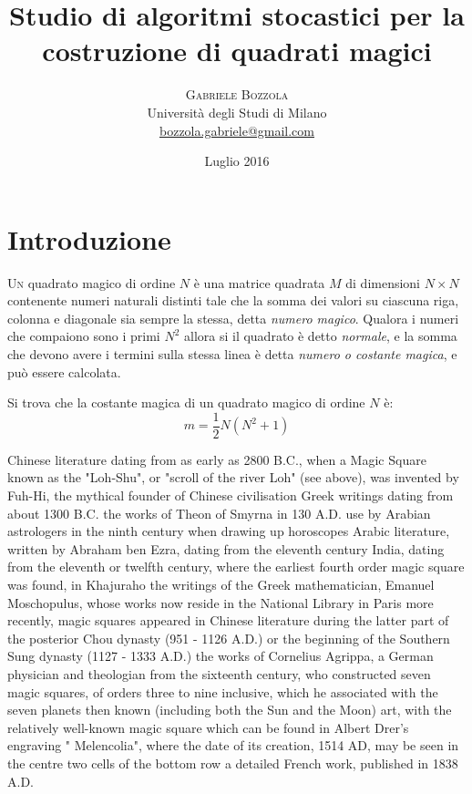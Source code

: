\documentclass[italian,twoside,twocolumn]{article}
\title{Studio di algoritmi stocastici per la costruzione di quadrati magici} %
\author{%
\textsc{Gabriele Bozzola} \\[1ex] %
\normalsize Università degli Studi di Milano \\ %
\normalsize \href{mailto:bozzola.gabriele@gmail.com}{bozzola.gabriele@gmail.com} %
}
\date{Luglio 2016} %
\begin{document}
\maketitle


\section{Introduzione}

\lettrine[nindent=0em,lines=3]{U}n quadrato magico di ordine $ N $ è una matrice quadrata  $ M $  di dimensioni $ N\times N $ contenente numeri naturali distinti tale che la somma dei valori su ciascuna riga, colonna e diagonale sia sempre la stessa, detta \emph{numero magico}. Qualora i numeri che compaiono sono i primi $ N^2 $ allora si il quadrato è detto \emph{normale}, e la somma che devono avere i termini sulla stessa linea è detta \emph{numero o costante magica}, e può essere calcolata. 

Si trova che la costante magica di un quadrato magico di ordine $ N $ è:
\[	 \mathit{m} = \frac{1}{2} N (N^2 + 1)	\]

Chinese literature dating from as early as 2800 B.C., when a Magic Square known as the "Loh-Shu", or "scroll of the river Loh" (see above), was invented by Fuh-Hi, the mythical founder of Chinese civilisation
Greek writings dating from about 1300 B.C.
the works of Theon of Smyrna in 130 A.D.
use by Arabian astrologers in the ninth century when drawing up horoscopes
Arabic literature, written by Abraham ben Ezra, dating from the eleventh century
India, dating from the eleventh or twelfth century, where the earliest fourth order magic square was found, in Khajuraho
the writings of the Greek mathematician, Emanuel Moschopulus, whose works now reside in the National Library in Paris
more recently, magic squares appeared in Chinese literature during the latter part of the posterior Chou dynasty (951 - 1126 A.D.) or the beginning of the Southern Sung dynasty (1127 - 1333 A.D.)
the works of Cornelius Agrippa, a German physician and theologian from the sixteenth century, who constructed seven magic squares, of orders three to nine inclusive, which he associated with the seven planets then known (including both the Sun and the Moon)
art, with the relatively well-known magic square which can be found in Albert Drer's engraving " Melencolia", where the date of its creation, 1514 AD, may be seen in the centre two cells of the bottom row
a detailed French work, published in 1838 A.D.
\end{document}
